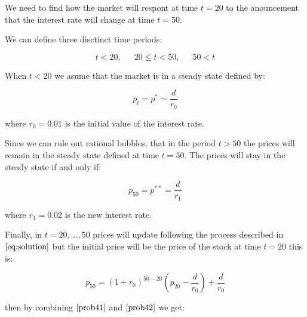 \documentclass[10pt,notitlepage,onecolumn,aps,pra]{revtex4-1}
\begin{document}
We need to find how the market will respont at time \(t=20\) to the
anouncement that the interest rate will change at time \(t=50\).

We can define three disctinct time periods:

\[t<20, \enspace\enspace\enspace 20\leq t < 50, \enspace\enspace\enspace  50 < t\]

When \(t<20\) we asume that the market is in a steady state defined by:

\[p_t = p^* = \frac{d}{r_0}\]

where \(r_0=0.01\) is the initial value of the interest rate.

Since we can rule out rational bubbles, that in the period \(t>50\) the
prices will remain in the steady state defined at time \(t=50\). The
prices will stay in the steady state if and only if:

\[p_{50} = p^{**} = \frac{d}{r_1} \label{prob41}\tag{4.1}\]

where \(r_1 = 0.02\) is the new interest rate.

Finally, in \(t=20,...,50\) prices will update following the process
described in \(\eqref{eq:solution}\) but the initial price will be the
price of the stock at time \(t=20\) this is:

\[p_{50} = (1+r_0)^{50-20}\left(p_{20} -\frac{d}{r_0} \right) + \frac{d}{r_0}\label{prob42}\tag{4.2}\]

then by combining \(\eqref{prob41}\) and \(\eqref{prob42}\) we get:
\end{document}
